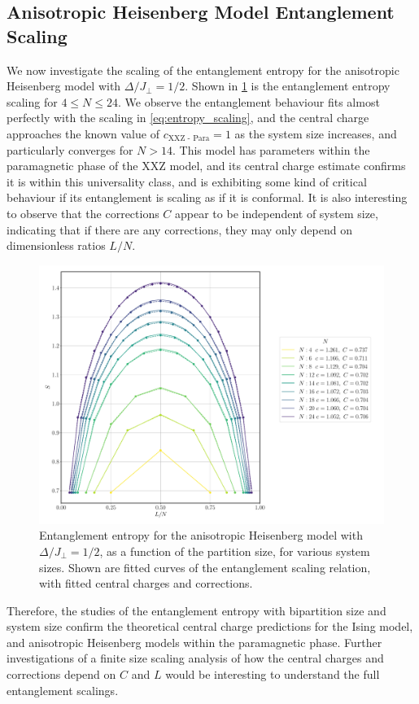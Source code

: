 \documentclass[12pt]{article}{}
\begin{document}
\subsection{Anisotropic Heisenberg Model Entanglement Scaling}
We now investigate the scaling of the entanglement entropy for the anisotropic Heisenberg model with $\Delta/J_{\perp} = 1/2$. Shown in \cref{fig:other_entanglement_partition} is the entanglement entropy scaling for $4 \leq N \leq 24$. We observe the entanglement behaviour fits almost perfectly with the scaling in \cref{eq:entropy_scaling}, and the central charge approaches the known value \cite{Cole2017} of $\boxed{c_{\textrm{XXZ - Para}} = 1}$ as the system size increases, and particularly converges for $N>14$. This model has parameters within the paramagnetic phase of the XXZ model, and its central charge estimate confirms it is within this universality class, and is exhibiting some kind of critical behaviour if its entanglement is scaling as if it is conformal. It is also interesting to observe that the corrections $C$ appear to be independent of system size, indicating that if there are any corrections, they may only depend on dimensionless ratios $L/N$.
\begin{figure}[H]
  \centering
  \includegraphics[width=1\textwidth]{figures/other/entanglement__partition__N__U__J.pdf}
  \caption{Entanglement entropy for the anisotropic Heisenberg model with $\Delta/J_{\perp} = 1/2$, as a function of the partition size, for various system sizes. Shown are fitted curves of the entanglement scaling relation, with fitted central charges and corrections.}
  \label{fig:other_entanglement_partition}
\end{figure}
Therefore, the studies of the entanglement entropy with bipartition size and system size confirm the theoretical central charge predictions for the Ising model, and anisotropic Heisenberg models within the paramagnetic phase. Further investigations of a finite size scaling analysis of how the central charges and corrections depend on $C$ and $L$ would be interesting to understand the full entanglement scalings.
\end{document}
